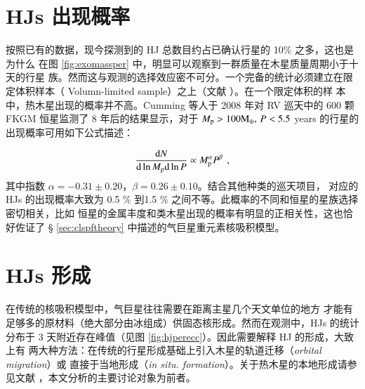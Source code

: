 \section{HJs 出现概率}  \label{sec:hjoccurate}

按照已有的数据，现今探测到的 HJ 总数目约占已确认行星的 10\% 之多，这也是为什么
在图 \ref{fig:exomassper} 中，明显可以观察到一群质量在木星质量周期小于十天的行星
族。然而这与观测的选择效应密不可分。一个完备的统计必须建立在限定体积样本（
Volumn-limited sample）之上（文献 ）。在一个限定体积的样
本中，热木星出现的概率并不高。Cumming 等人于 2008 年对 RV 巡天中的 600 颗 FKGM 
恒星监测了 8 年后的结果显示\cite{Cumming2008}，对于 $M_\mathrm{p} > 100 \mathrm{M}_\oplus,\, 
P<5.5$ years 的行星的出现概率可用如下公式描述：

\begin{equation} \label{eq:pltoccurate}
\frac{\mathrm{d} N}{\mathrm{d}\ln M_\mathrm{p} \mathrm{d}\ln P} \propto  M_\mathrm{p}^\alpha P^\beta \ \, ,
\end{equation} 
其中指数 $\alpha = -0.31 \pm 0.20 $，$\beta = 0.26 \pm 0.10$。结合其他种类的巡天项目，
对应的 HJs 的出现概率大致为 0.5 \% 到1.5 \% 之间不等\cite{Howard2012,Marcy2005,
Mayor2011,Wright2012}。此概率的不同和恒星的星族选择密切相关\cite{Wright2012}，比如
恒星的金属丰度和类木星出现的概率有明显的正相关性\cite{Gonzalez1997,Santos2001,
Santos2004,Fischer2005,Udry2007,Sozzetti2009,Sousa2011}，这也恰好佐证了 \S 
\ref{sec:clspftheory} 中描述的气巨星重元素核吸积模型。


\section{HJs 形成} \label{sec:hjform}


在传统的核吸积模型中\cite{IdaLin2004b}，气巨星往往需要在距离主星几个天文单位的地方
才能有足够多的原材料（绝大部分由冰组成）供固态核形成。然而在观测中，HJs 的统计
分布于 3 天附近存在峰值（见图 \ref{fig:hjperecc}）。因此需要解释 HJ 的形成，大致上有
两大种方法：在传统的行星形成基础上引入木星的轨道迁移（\textit{orbital migration}）或
直接于当地形成（\textit{in situ. formation}）。关于热木星的本地形成请参见文献 
，本文分析的主要讨论对象为前者。


